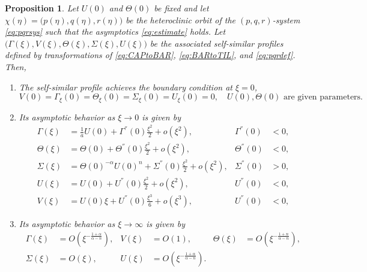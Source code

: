 \documentclass[a4paper,11pt]{article}
\newtheorem{proposition}{Proposition}[section]
\begin{document}
\begin{proposition}
 Let $U(0)$ and $\Theta(0)$ be fixed and let $\chi(\eta)=\big(p(\eta),q(\eta),r(\eta)\big)$ be the heteroclinic orbit of the $(p,q,r)$-system \eqref{eq:pqrsys} such that the asymptotics \eqref{eq:estimate} holds. Let $\big(\Gamma(\xi),V(\xi),\Theta(\xi),\Sigma(\xi),U(\xi)\big)$ be the associated self-similar profiles defined by transformations of \eqref{eq:CAPtoBAR}, \eqref{eq:BARtoTIL}, and \eqref{eq:pqrdef}. Then, 
 \begin{enumerate}
  \item[(i)] The self-similar profile achieves the boundary condition at $\xi=0$,
    \begin{equation*}
    {V}(0) = \Gamma_\xi(0) = \Theta_\xi(0)=\Sigma_\xi(0) = {U}_\xi(0)=0, \quad \text{$U(0), \Theta(0)$ are given parameters.}
  \end{equation*}
  \item[(ii)] Its asymptotic behavior as $\xi \rightarrow 0$ is given by 
  \begin{equation} \label{eq:ss_asymp0}
  \begin{aligned}
    \Gamma(\xi) &= \frac{1}{a}U(0) + \Gamma^{''}(0)\frac{\xi^2}{2} + o(\xi^2), & \Gamma^{''}(0)&<0,\\
    \Theta(\xi) &= \Theta(0) + \Theta^{''}(0)\frac{\xi^2}{2} + o(\xi^2), & \Theta^{''}(0)&<0,\\
    \Sigma(\xi) &= \Theta(0)^{-\alpha}{U(0)^n}+ \Sigma^{''}(0)\frac{\xi^2}{2} + o(\xi^2), & \Sigma^{''}(0)&>0, \\
    U(\xi) &= U(0) + U^{''}(0)\frac{\xi^2}{2} + o(\xi^2), & U^{''}(0)&<0,\\
    V(\xi) &= U(0)\xi + U^{''}(0)\frac{\xi^3}{6} + o(\xi^3), & U^{''}(0)&<0,
  \end{aligned}
  \end{equation}
  \item[(iii)] Its asymptotic behavior as $\xi \rightarrow \infty$ is given by
  \begin{equation} \label{eq:ss_asymp1}
  \begin{aligned}
    \Gamma(\xi) &= O(\xi^{-\frac{1+\alpha}{\alpha-n}}), & V(\xi) &= O(1), &    \Theta(\xi) &= O(\xi^{-\frac{1+n}{\alpha-n}}),\\
   \Sigma(\xi) &= O(\xi), &   U(\xi) &= O(\xi^{-\frac{1+\alpha}{\alpha-n}}).
  \end{aligned}
  \end{equation}
 \end{enumerate}
 
\end{proposition}
\end{document}
